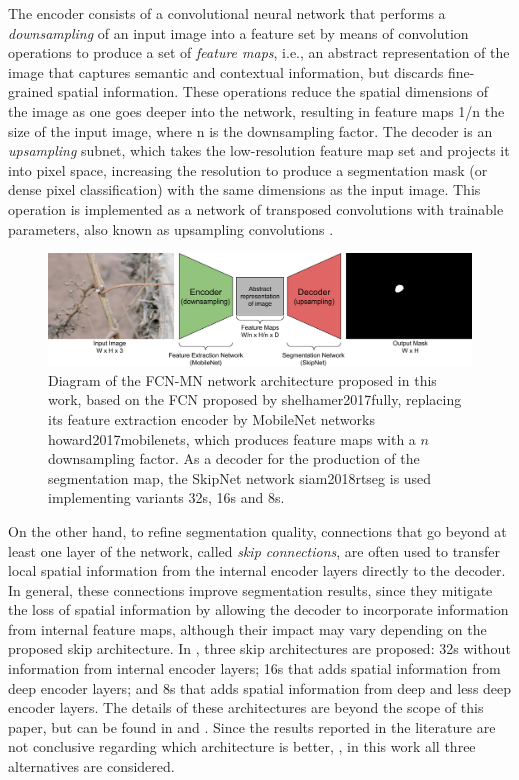\documentclass[a4paper,authoryear,review]{elsarticle}
\begin{document}
The encoder consists of a convolutional neural network that performs a \emph{downsampling} of an input image into a feature set by means of convolution operations to produce a set of \emph{feature maps}, i.e., an abstract representation of the image that captures semantic and contextual information, but discards fine-grained spatial information. These operations reduce the spatial dimensions of the image as one goes deeper into the network, resulting in feature maps 1/n the size of the input image, where n is the downsampling factor. The decoder is an \emph{upsampling} subnet, which takes the low-resolution feature map set and projects it into pixel space, increasing the resolution to produce a segmentation mask (or dense pixel classification) with the same dimensions as the input image. This operation is implemented as a network of transposed convolutions with trainable parameters, also known as upsampling convolutions \citep{shelhamer2017fully}. 



\begin{figure}
    \centering
    \includegraphics[width=12cm]{figures/Figure1.png}
    \caption{
Diagram of the FCN-MN network architecture proposed in this work, based on the FCN proposed by {shelhamer2017fully}, replacing its feature extraction encoder by MobileNet networks {howard2017mobilenets}, which produces feature maps with a $n$ downsampling factor. As a decoder for the production of the segmentation map, the SkipNet network {siam2018rtseg} is used implementing variants 32s, 16s and 8s.
    }
    \label{fig:FCN-MN}
\end{figure}

On the other hand, to refine segmentation quality, connections that go beyond at least one layer of the network, called \emph{skip connections}, are often used to transfer local spatial information from the internal encoder layers directly to the decoder. In general, these connections improve segmentation results, since they mitigate the loss of spatial information by allowing the decoder to incorporate information from internal feature maps, although their impact may vary depending on the proposed skip architecture. In \citet{long2015fully}, three skip architectures are proposed: 32s without information from internal encoder layers; 16s that adds spatial information from deep encoder layers; and 8s that adds spatial information from deep and less deep encoder layers. The details of these architectures are beyond the scope of this paper, but can be found in \citet{long2015fully} and \citet{shelhamer2017fully}. Since the results reported in the literature are not conclusive regarding which architecture is better,  \citet{long2015fully, shelhamer2017fully}, in this work all three alternatives are considered.
\end{document}
